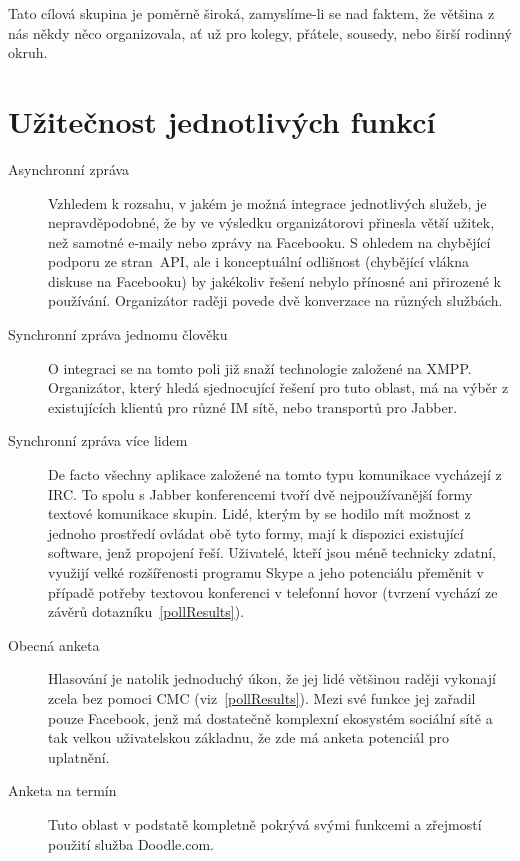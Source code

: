 \documentclass[12pt,oneside,final]{fithesis2}
\begin{document}
Tato cílová skupina je poměrně široká, zamyslíme-li se nad faktem, že většina z nás někdy něco organizovala, ať už pro kolegy, přátele, sousedy, nebo širší rodinný okruh.


\section{Užitečnost jednotlivých funkcí}\label{utility}
\begin{description}
    \item[Asynchronní zpráva]
        Vzhledem k rozsahu, v jakém je možná integrace jednotlivých služeb, je nepravděpodobné, že by ve výsledku organizátorovi přinesla větší užitek, než samotné e-maily nebo zprávy na Facebooku. S ohledem na chybějící podporu ze stran~API, ale i konceptuální odlišnost (chybějící vlákna diskuse na Facebooku) by jakékoliv řešení nebylo přínosné ani přirozené k používání. Organizátor raději povede dvě konverzace na různých službách.

    \item[Synchronní zpráva jednomu člověku]
        O integraci se na tomto poli již snaží technologie založené na XMPP. Organizátor, který hledá sjednocující řešení pro tuto oblast, má na výběr z existujících klientů pro různé IM sítě, nebo transportů pro Jabber.

    \item[Synchronní zpráva více lidem]
        De facto všechny aplikace založené na tomto typu komunikace vycházejí z IRC. To spolu s Jabber konferencemi tvoří dvě nejpoužívanější formy textové komunikace skupin. Lidé, kterým by se hodilo mít možnost z jednoho prostředí ovládat obě tyto formy, mají k dispozici existující software, jenž propojení řeší. Uživatelé, kteří jsou méně technicky zdatní, využijí velké rozšířenosti programu Skype a jeho potenciálu přeměnit v případě potřeby textovou konferenci v telefonní hovor (tvrzení vychází ze závěrů dotazníku~\ref{pollResults}).

    \item[Obecná anketa]
        Hlasování je natolik jednoduchý úkon, že jej lidé většinou raději vykonají zcela bez pomoci CMC (viz~\ref{pollResults}). Mezi své funkce jej zařadil pouze Facebook, jenž má dostatečně komplexní ekosystém sociální sítě a tak velkou uživatelskou základnu, že zde má anketa potenciál pro uplatnění.

    \item[Anketa na termín]
        Tuto oblast v podstatě kompletně pokrývá svými funkcemi a zřejmostí použití služba Doodle.com.


\end{description}
\end{document}

